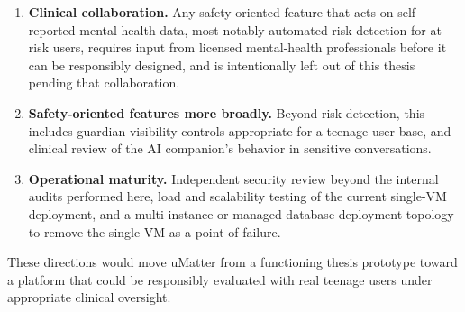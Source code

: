 \begin{enumerate}
\item \textbf{Clinical collaboration.} Any safety-oriented feature that acts on self-reported mental-health data, most notably automated risk detection for at-risk users, requires input from licensed mental-health professionals before it can be responsibly designed, and is intentionally left out of this thesis pending that collaboration.
\item \textbf{Safety-oriented features more broadly.} Beyond risk detection, this includes guardian-visibility controls appropriate for a teenage user base, and clinical review of the AI companion's behavior in sensitive conversations.
\item \textbf{Operational maturity.} Independent security review beyond the internal audits performed here, load and scalability testing of the current single-VM deployment, and a multi-instance or managed-database deployment topology to remove the single VM as a point of failure.
\end{enumerate}

These directions would move uMatter from a functioning thesis prototype toward a platform that could be responsibly evaluated with real teenage users under appropriate clinical oversight.
